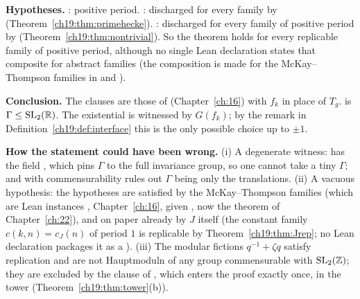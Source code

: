 \begin{dictionary}
\textbf{Hypotheses.}  : positive period.  : discharged for every family by
 (Theorem~\ref{ch19:thm:primehecke}).  : discharged
for every family of positive period by  (Theorem~\ref{ch19:thm:nontrivial}).  So the
theorem holds for every replicable family of positive period, although no single Lean declaration states that composite for abstract
families (the composition is made for the McKay--Thompson families in  and
).

\textbf{Conclusion.}  The clauses are those of  (Chapter~\ref{ch:16}) with $f_k$ in place of $T_g$.
 is $\Gamma\le\mathrm{SL}_2(\mathbb{R})$.  The existential is witnessed by $G(f_k)$; by the remark in Definition~\ref{ch19:def:interface} this is
the only possible choice up to $\pm1$.

\textbf{How the statement could have been wrong.}  (i) A degenerate witness:  has the field ,
which pins $\Gamma$ to the full invariance group, so one cannot take a tiny $\Gamma$; and  with commensurability rules out
$\Gamma$ being only the translations.  (ii) A vacuous hypothesis: the hypotheses are satisfied by the McKay--Thompson families (which are Lean
instances , Chapter~\ref{ch:16}, given , now the
theorem  of Chapter~\ref{ch:22}), and on paper already by $J$ itself (the constant family $c(k,n)=c_J(n)$ of period $1$ is replicable by
Theorem~\ref{ch19:thm:Jrep}; no Lean declaration packages it as a ).  (iii) The modular fictions $q^{-1}+\zeta q$ satisfy
replication and are not Hauptmoduln of any group commensurable with $\mathrm{SL}_2(\mathbb{Z})$; they are excluded by the clause  of
, which enters the proof exactly once, in the tower (Theorem~\ref{ch19:thm:tower}(b)).
\end{dictionary}
